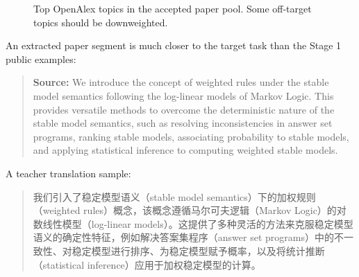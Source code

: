 \documentclass{article}
\begin{document}
\begin{figure}[htbp]
    \centering
    \caption{Top OpenAlex topics in the accepted paper pool. Some off-target topics should be downweighted.}
    \label{fig:stage2-categories}
\end{figure}

An extracted paper segment is much closer to the target task than the Stage 1 public examples:

\begin{quote}\small
    \textbf{Source:} We introduce the concept of weighted rules under the stable model semantics following the log-linear models of Markov Logic. This provides versatile methods to overcome the deterministic nature of the stable model semantics, such as resolving inconsistencies in answer set programs, ranking stable models, associating probability to stable models, and applying statistical inference to computing weighted stable models.
\end{quote}

A teacher translation sample:

\begin{quote}\small
    我们引入了稳定模型语义（stable model semantics）下的加权规则（weighted rules）概念，该概念遵循马尔可夫逻辑（Markov Logic）的对数线性模型（log-linear models）。这提供了多种灵活的方法来克服稳定模型语义的确定性特征，例如解决答案集程序（answer set programs）中的不一致性、对稳定模型进行排序、为稳定模型赋予概率，以及将统计推断（statistical inference）应用于加权稳定模型的计算。
\end{quote}
\end{document}
